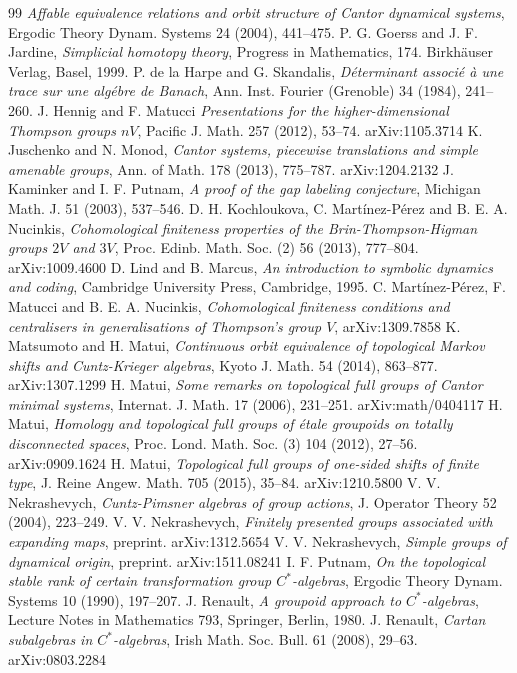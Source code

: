 \documentclass[11pt]{article}
\theoremstyle{definition}
\numberwithin{equation}{section}
\begin{document}
\begin{thebibliography}{99}
\textit{Affable equivalence relations and orbit structure 
of Cantor dynamical systems}, 
Ergodic Theory Dynam. Systems 24 (2004), 441--475. 
P. G. Goerss and J. F. Jardine, 
\textit{Simplicial homotopy theory}, 
Progress in Mathematics, 174. Birkh\"auser Verlag, Basel, 1999. 
P. de la Harpe and G. Skandalis, 
\textit{D\'eterminant associ\'e \`a une trace sur une alg\'ebre de Banach}, 
Ann. Inst. Fourier (Grenoble) 34 (1984), 241--260. 
J. Hennig and F. Matucci
\textit{Presentations for the higher-dimensional Thompson groups $nV$}, 
Pacific J. Math. 257 (2012), 53--74. 
arXiv:1105.3714
K. Juschenko and N. Monod, 
\textit{Cantor systems, piecewise translations and simple amenable groups}, 
Ann. of Math. 178 (2013), 775--787. 
arXiv:1204.2132
J. Kaminker and I. F. Putnam, 
\textit{A proof of the gap labeling conjecture}, 
Michigan Math. J. 51 (2003), 537--546. 
D. H. Kochloukova, C. Mart\'inez-P\'erez and B. E. A. Nucinkis, 
\textit{Cohomological finiteness properties of the Brin-Thompson-Higman groups 
$2V$ and $3V$}, 
Proc. Edinb. Math. Soc. (2) 56 (2013), 777--804. 
arXiv:1009.4600
D. Lind and B. Marcus, 
\textit{An introduction to symbolic dynamics and coding}, 
Cambridge University Press, Cambridge, 1995. 
C. Mart\'inez-P\'erez, F. Matucci and B. E. A. Nucinkis, 
\textit{Cohomological finiteness conditions and 
centralisers in generalisations of Thompson's group $V$}, 
arXiv:1309.7858 
K. Matsumoto and H. Matui, 
\textit{Continuous orbit equivalence of topological Markov shifts 
and Cuntz-Krieger algebras}, 
Kyoto J. Math. 54 (2014), 863--877. 
arXiv:1307.1299
H. Matui, 
\textit{Some remarks on topological full groups of Cantor minimal systems}, 
Internat. J. Math. 17 (2006), 231--251. 
arXiv:math/0404117
H. Matui, 
\textit{Homology and topological full groups of \'etale groupoids 
on totally disconnected spaces}, 
Proc. Lond. Math. Soc. (3) 104 (2012), 27--56. 
arXiv:0909.1624
H. Matui, 
\textit{Topological full groups of one-sided shifts of finite type}, 
J. Reine Angew. Math. 705 (2015), 35--84. 
arXiv:1210.5800
V. V. Nekrashevych, 
\textit{Cuntz-Pimsner algebras of group actions}, 
J. Operator Theory 52 (2004), 223--249. 
V. V. Nekrashevych, 
\textit{Finitely presented groups associated with expanding maps}, 
preprint. 
arXiv:1312.5654
V. V. Nekrashevych, 
\textit{Simple groups of dynamical origin}, 
preprint. 
arXiv:1511.08241
I. F. Putnam, 
\textit{On the topological stable rank of 
certain transformation group $C^*$-algebras}, 
Ergodic Theory Dynam. Systems 10 (1990), 197--207. 
J. Renault, 
\textit{A groupoid approach to $C^*$-algebras}, 
Lecture Notes in Mathematics 793, Springer, Berlin, 1980. 
J. Renault, 
\textit{Cartan subalgebras in $C^*$-algebras}, 
Irish Math. Soc. Bull. 61 (2008), 29--63. 
arXiv:0803.2284
\end{thebibliography}
\end{document}
